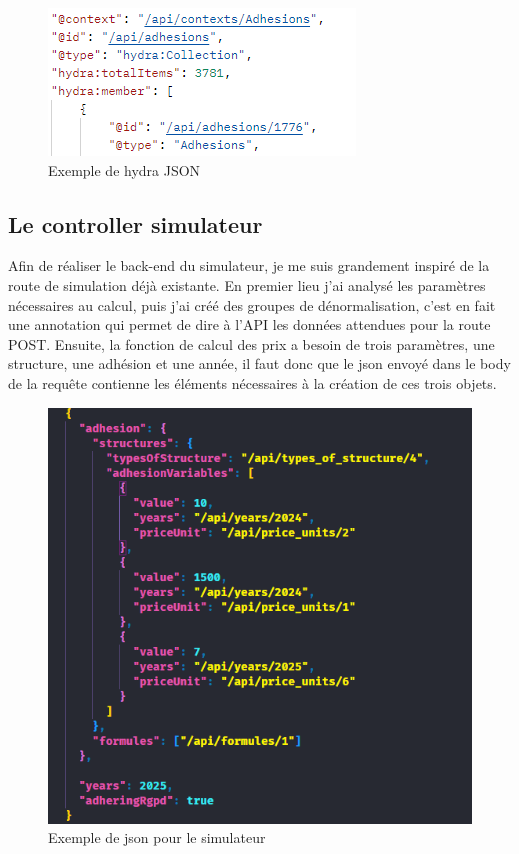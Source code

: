 \documentclass[a4paper,12pt]{report}
\begin{document}
\begin{figure}[ht]
    \centering
    \includegraphics[scale=0.8]{hydraJSON.png}
    \caption{Exemple de hydra JSON}
    \label{fig:hyda-json}
\end{figure}

\subsection{Le controller simulateur}
Afin de réaliser le back-end du simulateur, je me suis grandement inspiré de la route de simulation déjà existante. En premier lieu j'ai analysé les paramètres nécessaires au calcul, puis j'ai créé des groupes de dénormalisation, c'est en fait une annotation qui permet de dire à l'API les données attendues pour la route POST. Ensuite, la fonction de calcul des prix a besoin de trois paramètres, une structure, une adhésion et une année, il faut donc que le json envoyé dans le body de la requête contienne les éléments nécessaires à la création de ces trois objets.

\begin{figure}[h]
    \centering
    \includegraphics[scale=0.6]{jsonSimu.png}
    \caption{Exemple de json pour le simulateur}
    \label{fig:json-simu}
\end{figure}
\end{document}
